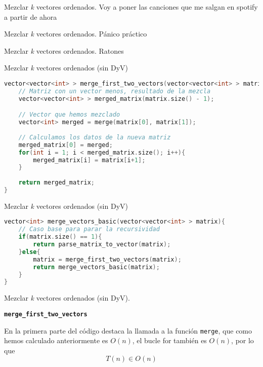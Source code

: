 \documentclass[10pt, xcolor=table]{beamer}
\begin{document}
\begin{frame}[fragile]{Mezclar \textit{k} vectores ordenados. }
Voy a poner las canciones que me salgan en spotify a partir de ahora
\end{frame}

\begin{frame}[fragile]{Mezclar \textit{k} vectores ordenados. }
Pánico práctico
\end{frame}

\begin{frame}[fragile]{Mezclar \textit{k} vectores ordenados. }
Ratones
\end{frame}

\begin{frame}[fragile]{Mezclar \textit{k} vectores ordenados (sin DyV)}
\begin{lstlisting}[language=C]
vector<vector<int> > merge_first_two_vectors(vector<vector<int> > matrix){
	// Matriz con un vector menos, resultado de la mezcla
	vector<vector<int> > merged_matrix(matrix.size() - 1);

	// Vector que hemos mezclado
	vector<int> merged = merge(matrix[0], matrix[1]);
	
	// Calculamos los datos de la nueva matriz
	merged_matrix[0] = merged;
	for(int i = 1; i < merged_matrix.size(); i++){
		merged_matrix[i] = matrix[i+1];
	}
	
	return merged_matrix;
}
\end{lstlisting}
\end{frame}

\begin{frame}[fragile]{Mezclar \textit{k} vectores ordenados (sin DyV)}
\begin{lstlisting}[language=C]
vector<int> merge_vectors_basic(vector<vector<int> > matrix){
	// Caso base para parar la recursividad
	if(matrix.size() == 1){
		return parse_matrix_to_vector(matrix);	
	}else{
		matrix = merge_first_two_vectors(matrix);
		return merge_vectors_basic(matrix);
	}
}

\end{lstlisting}
\end{frame}

\begin{frame}[fragile]{Mezclar \textit{k} vectores ordenados (sin DyV). }

\begin{center}
	\textbf{\large{\texttt{merge\_first\_two\_vectors}}}
\end{center}

En la primera parte del código destaca la llamada a la función \texttt{merge}, que como hemos calculado anteriormente es $O(n)$, el bucle for también es $O(n)$, por lo que 
$$T(n) \in O(n)$$

\end{frame}
\end{document}
